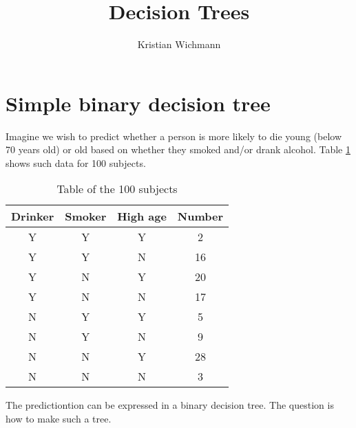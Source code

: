 \documentclass[12pt, a4paper]{article}
\title{Decision Trees}
\author{Kristian Wichmann}
\numberwithin{equation}{section}
\begin{document}
\maketitle

\section{Simple binary decision tree}
Imagine we wish to predict whether a person is more likely to die young (below 70 years old) or old based on whether they smoked and/or drank alcohol. Table \ref{table:drink_smoke_age} shows such data for 100 subjects.

\begin{table}
\centering
\label{table:drink_smoke_age}
\begin{tabular}{cccc}
\hline
\multicolumn{1}{|c|}{Drinker} & \multicolumn{1}{c|}{Smoker} & \multicolumn{1}{c|}{High age} & \multicolumn{1}{c|}{Number} \\ \hline
Y                             & Y                           & Y                             & 2                           \\
Y                             & Y                           & N                             & 16                          \\
Y                             & N                           & Y                             & 20                          \\
Y                             & N                           & N                             & 17                          \\
N                             & Y                           & Y                             & 5                           \\
N                             & Y                           & N                             & 9                           \\
N                             & N                           & Y                             & 28                          \\
N                             & N                           & N                             & 3                          
\end{tabular}
\caption{Table of the 100 subjects}
\end{table}

The predictiontion can be expressed in a binary decision tree. The question is how to make such a tree.
\end{document}
